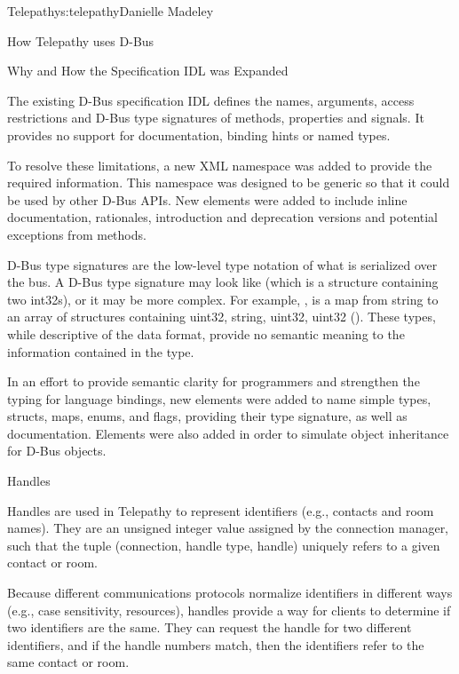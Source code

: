 \begin{aosachapter}{Telepathy}{s:telepathy}{Danielle Madeley}
\begin{aosasect1}{How Telepathy uses D-Bus}
\begin{aosabox}{Why and How the Specification IDL was Expanded}

The existing D-Bus specification IDL defines the names, arguments,
access restrictions and D-Bus type signatures of methods, properties
and signals. It provides no support for documentation, binding hints
or named types.

To resolve these limitations, a new XML namespace was added to provide
the required information. This namespace was designed to be generic so
that it could be used by other D-Bus APIs. New elements were added to
include inline documentation, rationales, introduction and deprecation
versions and potential exceptions from methods.

D-Bus type signatures are the low-level type notation of what is
serialized over the bus. A D-Bus type signature may look like
 (which is a structure containing two int32s), or it may be
more complex.  For example, , is a map from string
to an array of structures containing uint32, string, uint32, uint32
().  These types, while
descriptive of the data format, provide no semantic meaning to the
information contained in the type.

In an effort to provide semantic clarity for programmers and
strengthen the typing for language bindings, new elements were added
to name simple types, structs, maps, enums, and flags, providing their
type signature, as well as documentation.  Elements were also added in
order to simulate object inheritance for D-Bus objects.

\end{aosabox}


\begin{aosasect2}{Handles}

Handles are used in Telepathy to represent identifiers (e.g., contacts
and room names). They are an unsigned integer value assigned by the
connection manager, such that the tuple (connection, handle type,
handle) uniquely refers to a given contact or room.

\pagebreak

Because different communications protocols normalize identifiers in
different ways (e.g., case sensitivity, resources), handles provide a
way for clients to determine if two identifiers are the same. They can
request the handle for two different identifiers, and if the handle
numbers match, then the identifiers refer to the same contact or room.


\end{aosasect2}
\end{aosasect1}
\end{aosachapter}
